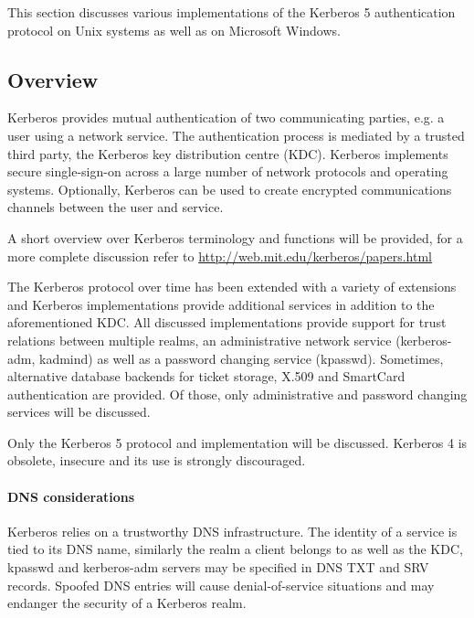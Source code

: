 This section discusses various implementations of the Kerberos 5 authentication protocol
on Unix systems as well as on Microsoft Windows. 

\subsection{Overview}
\label{subsection:kerberos_overview}

Kerberos provides mutual authentication of two communicating parties, e.g. a user using a network service. The authentication process is mediated by a trusted third party, the Kerberos key distribution centre (KDC). Kerberos implements secure single-sign-on across a large number of network protocols and operating systems. Optionally, Kerberos can be used to create encrypted communications channels between the user and service.

A short overview over Kerberos terminology and functions will be provided, for a more complete discussion refer to \url{http://web.mit.edu/kerberos/papers.html}


The Kerberos protocol over time has been extended with a variety of extensions and Kerberos implementations provide additional services in addition to the aforementioned KDC. All discussed implementations provide support for trust relations between multiple realms, an administrative network service (kerberos-adm, kadmind) as well as a password changing service (kpasswd). Sometimes, alternative database backends for ticket storage, X.509 and SmartCard authentication are provided. Of those, only administrative and password changing services will be discussed.

Only the Kerberos 5 protocol and implementation will be discussed. Kerberos 4 is obsolete, insecure and its use is strongly discouraged.


\paragraph{DNS considerations}
Kerberos relies on a trustworthy DNS infrastructure. The identity of a service is tied to its DNS name, similarly the realm a client belongs to as well as the KDC, kpasswd and kerberos-adm servers may be specified in DNS TXT and SRV records. Spoofed DNS entries will cause denial-of-service situations and may endanger the security of a Kerberos realm.

